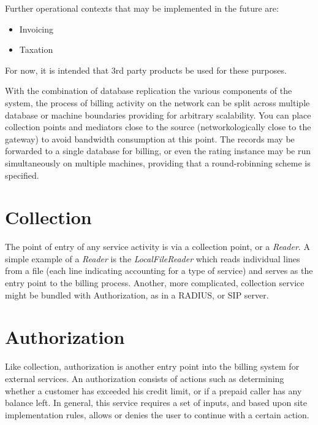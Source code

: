 	Further operational contexts that may be implemented in the future are:
	\begin{itemize}
	  \item Invoicing
	  \item Taxation
	\end{itemize}

	For now, it is intended that 3rd party products be used for these purposes.

	With the combination of database replication the various components of the
	system, the process of billing activity on the network can be split across
	multiple database or machine boundaries providing for arbitrary scalability.
	You can place collection points and mediators close to the source
	(networkologically close to the gateway) to avoid bandwidth consumption at
	this point. The records may be forwarded to a single database for billing,
	or even the rating instance may be run simultaneously on multiple machines,
	providing that a round-robinning scheme is specified.


	\section{Collection}
		The point of entry of any service activity is via a collection point, or
		a \emph{Reader}. A simple example of a \emph{Reader} is the
		\emph{LocalFileReader} which reads individual
		lines from a file (each
		line indicating accounting for a type of service) and serves as the entry
		point to the billing process. Another, more complicated, collection
		service might be bundled with Authorization, as in a RADIUS, or SIP
		server.

	\section{Authorization}
		Like collection, authorization is another entry point into the billing
		system for external services. An authorization consists of actions such
		as determining whether a customer has exceeded his credit limit, or if
		a prepaid caller has any balance left. In general, this service requires
		a set of inputs, and based upon site implementation rules, allows or
		denies the user to continue with a certain action.


